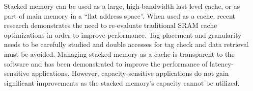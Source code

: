 
Stacked memory can be used as a large, high-bandwidth last level cache, or as part of main memory in a ``flat address space''. When used as a cache, recent research \cite{chou-micro2014,qureshi-micro2012} demonstrates the need to re-evaluate traditional SRAM cache optimizations in order to improve performance. Tag placement and granularity needs to be carefully studied and double accesses for tag check and data retrieval must be avoided. Managing stacked memory as a cache is transparent to the software and has been demonstrated to improve the performance of latency-sensitive applications. However, capacity-sensitive applications do not gain significant improvements as the stacked memory's capacity cannot be utilized.


